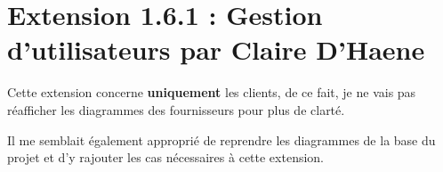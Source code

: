 \section{Extension 1.6.1 : Gestion d’utilisateurs par Claire D’Haene}

Cette extension concerne \textbf{uniquement} les clients, de ce fait, je ne vais pas réafficher les diagrammes des fournisseurs pour plus de clarté.
\newline
\begin{flushleft}
Il me semblait également approprié de reprendre les diagrammes de la base du projet et d’y rajouter les cas nécessaires à cette extension.
 \end{flushleft} 
